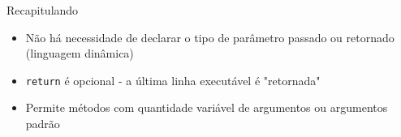 \begin{frame}[fragile,t]{Recapitulando}
  \begin{itemize}
    \item \alert{Não há necessidade} de declarar o tipo de parâmetro passado ou retornado (linguagem dinâmica)
    \item \verb!return! é \alert{opcional} - a última linha executável é "retornada"
    \item Permite métodos com \alert{quantidade variável} de argumentos ou argumentos padrão
  \end{itemize}
\end{frame}



